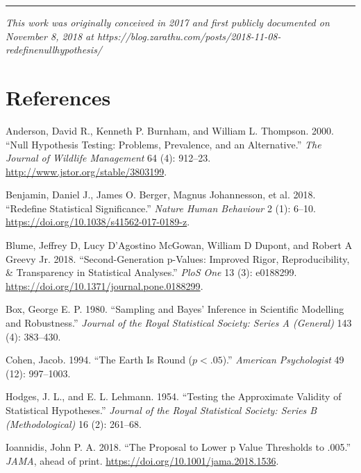 \documentclass[
  11pt,
  letterpaper,
]{article}
\newlength{\cslhangindent}
\newenvironment{CSLReferences}[2] %
 {\begin{list}{}{%
  \setlength{\itemindent}{0pt}
  \setlength{\leftmargin}{0pt}
  \setlength{\parsep}{0pt}
  \ifodd #1
   \setlength{\leftmargin}{\cslhangindent}
   \setlength{\itemindent}{-1\cslhangindent}
  \fi
  \setlength{\itemsep}{#2\baselineskip}}}
 {\end{list}}
\begin{document}
\begin{center}\rule{0.5\linewidth}{0.5pt}\end{center}

\emph{This work was originally conceived in 2017 and first publicly
documented on November 8, 2018 at
https://blog.zarathu.com/posts/2018-11-08-redefinenullhypothesis/}

\section*{References}\label{references}

\protect{}\label{refs}
\begin{CSLReferences}{1}{1}
Anderson, David R., Kenneth P. Burnham, and William L. Thompson. 2000.
{``Null Hypothesis Testing: Problems, Prevalence, and an Alternative.''}
\emph{The Journal of Wildlife Management} 64 (4): 912--23.
\url{http://www.jstor.org/stable/3803199}.

Benjamin, Daniel J., James O. Berger, Magnus Johannesson, et al. 2018.
{``Redefine Statistical Significance.''} \emph{Nature Human Behaviour} 2
(1): 6--10. \url{https://doi.org/10.1038/s41562-017-0189-z}.

Blume, Jeffrey D, Lucy D'Agostino McGowan, William D Dupont, and Robert
A Greevy Jr. 2018. {``Second-Generation p-Values: Improved Rigor,
Reproducibility, \& Transparency in Statistical Analyses.''} \emph{PloS
One} 13 (3): e0188299.
\url{https://doi.org/10.1371/journal.pone.0188299}.

Box, George E. P. 1980. {``Sampling and {Bayes}' Inference in Scientific
Modelling and Robustness.''} \emph{Journal of the Royal Statistical
Society: Series A (General)} 143 (4): 383--430.

Cohen, Jacob. 1994. {``The Earth Is Round (\(p < .05\)).''}
\emph{American Psychologist} 49 (12): 997--1003.

Hodges, J. L., and E. L. Lehmann. 1954. {``Testing the Approximate
Validity of Statistical Hypotheses.''} \emph{Journal of the Royal
Statistical Society: Series B (Methodological)} 16 (2): 261--68.

Ioannidis, John P. A. 2018. {``The Proposal to Lower p Value Thresholds
to .005.''} \emph{JAMA}, ahead of print.
\url{https://doi.org/10.1001/jama.2018.1536}.


\end{CSLReferences}
\end{document}
